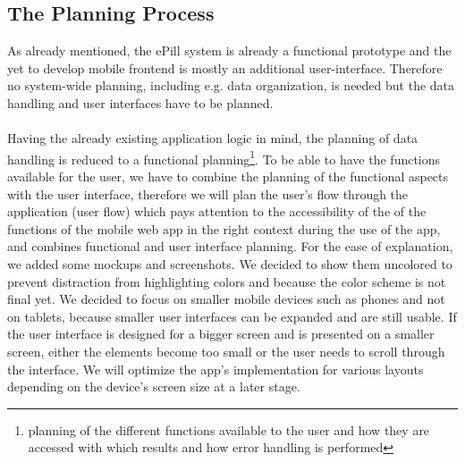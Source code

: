 \subsection{The Planning Process}
\label{subsec:Planning}
As already mentioned, the ePill system is already a functional prototype and the yet to develop mobile frontend is mostly an additional user-interface. Therefore no system-wide planning, including e.g. data organization, is needed but the data handling and user interfaces have to be planned.
\\
\\
Having the already existing application logic in mind, the planning of data handling is reduced to a functional planning\footnote{planning of the different functions available to the user and how they are accessed with which results and how error handling is performed}. To be able to have the functions available for the user, we have to combine the planning of the functional aspects with the user interface, therefore we will plan the user's flow through the application (user flow) which pays attention to the accessibility of the of the functions of the mobile web app in the right context during the use of the app, and combines functional and user interface planning. For the ease of explanation, we added some mockups and screenshots. We decided to show them uncolored to prevent distraction from highlighting colors and because the color scheme is not final yet. We decided to focus on smaller mobile devices such as phones and not on tablets, because smaller user interfaces can be expanded and are still usable. If the user interface is designed for a bigger screen and is presented on a smaller screen, either the elements become too small or the user needs to scroll through the interface. We will optimize the app's implementation for various layouts depending on the device's screen size at a later stage.
\\
